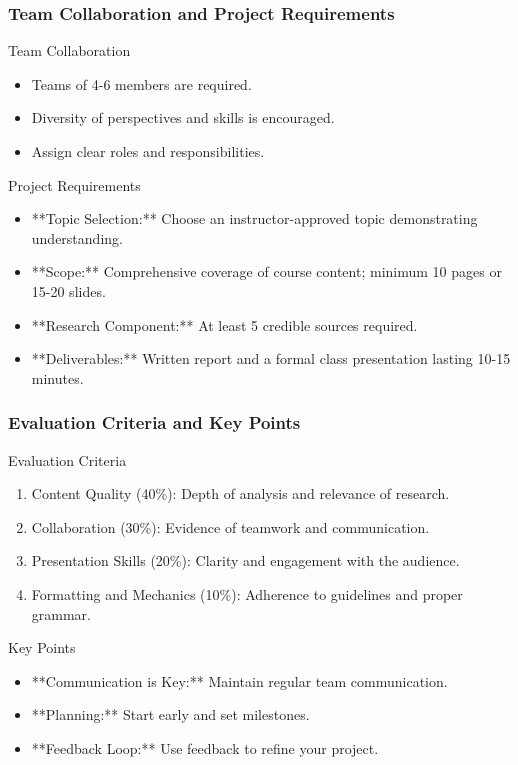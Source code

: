 \documentclass[aspectratio=169]{beamer}
\begin{document}
\begin{frame}[fragile]
    \frametitle{Team Collaboration and Project Requirements}
    \begin{block}{Team Collaboration}
        \begin{itemize}
            \item Teams of 4-6 members are required.
            \item Diversity of perspectives and skills is encouraged.
            \item Assign clear roles and responsibilities.
        \end{itemize}
    \end{block}

    \begin{block}{Project Requirements}
        \begin{itemize}
            \item **Topic Selection:** Choose an instructor-approved topic demonstrating understanding.
            \item **Scope:** Comprehensive coverage of course content; minimum 10 pages or 15-20 slides.
            \item **Research Component:** At least 5 credible sources required.
            \item **Deliverables:** Written report and a formal class presentation lasting 10-15 minutes.
        \end{itemize}
    \end{block}
\end{frame}

\begin{frame}[fragile]
    \frametitle{Evaluation Criteria and Key Points}
    \begin{block}{Evaluation Criteria}
        \begin{enumerate}
            \item Content Quality (40\%): Depth of analysis and relevance of research.
            \item Collaboration (30\%): Evidence of teamwork and communication.
            \item Presentation Skills (20\%): Clarity and engagement with the audience.
            \item Formatting and Mechanics (10\%): Adherence to guidelines and proper grammar.
        \end{enumerate}
    \end{block}

    \begin{block}{Key Points}
        \begin{itemize}
            \item **Communication is Key:** Maintain regular team communication.
            \item **Planning:** Start early and set milestones.
            \item **Feedback Loop:** Use feedback to refine your project.
        \end{itemize}
    \end{block}
\end{frame}
\end{document}
